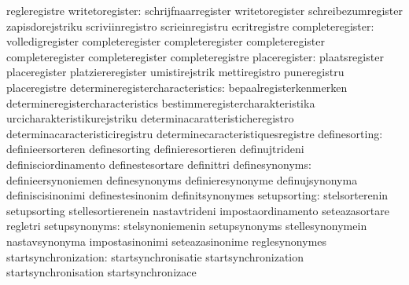                                   regleregistre
                 writetoregister: schrijfnaarregister              writetoregister
                                  schreibezumregister              zapisdorejstriku
                                  scriviinregistro                 scrieinregistru
                                  ecritregistre
                completeregister: volledigregister                 completeregister
                                  completeregister                 completeregister
                                  completeregister                 completeregister
                                  completeregistre
                   placeregister: plaatsregister                   placeregister
                                  platziereregister                umistirejstrik
                                  mettiregistro                    puneregistru
                                  placeregistre
determineregistercharacteristics: bepaalregisterkenmerken          determineregistercharacteristics
                                  bestimmeregistercharakteristika  urcicharakteristikurejstriku
                                  determinacaratteristicheregistro determinacaracteristiciregistru
                                  determinecaracteristiquesregistre
                   definesorting: definieersorteren                definesorting
                                  definieresortieren               definujtrideni
                                  definisciordinamento             definestesortare
                                  definittri
                  definesynonyms: definieersynoniemen              definesynonyms
                                  definieresynonyme                definujsynonyma
                                  definiscisinonimi                definestesinonim
                                  definitsynonymes
                    setupsorting: stelsorterenin                   setupsorting
                                  stellesortierenein               nastavtrideni
                                  impostaordinamento               seteazasortare
                                  regletri
                   setupsynonyms: stelsynoniemenin                 setupsynonyms
                                  stellesynonymein                 nastavsynonyma
                                  impostasinonimi                  seteazasinonime
                                  reglesynonymes
            startsynchronization: startsynchronisatie              startsynchronization
                                  startsynchronisation             startsynchronizace
